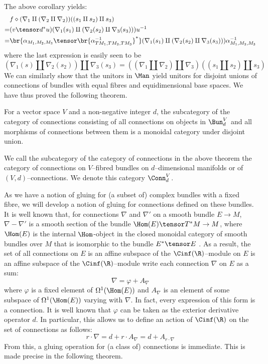 \documentclass[\PRJWD/Thick_TQFTs_and_Quantum_Information.tex]{subfiles}
\begin{document}
The above corollary yields:
\begin{align*}
   & f \diamond (\nabla_1 \amalg (\nabla_2 \amalg \nabla_2))(
        (s_1 \amalg s_2) \amalg s_3
     ) \\
  =& (v \tensor d^*u)(
      \nabla_1(s_1) \amalg (\nabla_2(s_2) \amalg \nabla_3(s_3))
     )u^{-1} \\
  =& \br{\alpha_{M_1, M_2, M_3} \tensor \br{\alpha^{-1}_{TM_1, TM_2, TM_3}}^*}(
      \nabla_1(s_1) \amalg (\nabla_2(s_2) \amalg \nabla_3(s_3))
     )\alpha_{M_1, M_2, M_3}^{-1}
\end{align*}
where the last expression is easily seen to be
\[
  (\nabla_1(s) \amalg \nabla_2(s_2)) \amalg \nabla_3(s_3)
  = ((\nabla_1 \amalg \nabla_2) \amalg \nabla_3)((s_1 \amalg s_2) \amalg s_3)
\]
We can similarly show that the unitors in $\Man$ yield unitors for disjoint
unions of connections of bundles with equal fibres and equidimensional base
spaces. We have thus proved the following theorem.
\begin{thm}\label{thm:bundle_gluing}
For a vector space $V$ and a non-negative integer $d$, the subcategory of the
category of connections consisting of all connections on objects in
$\Bun_d^{V}$ and all morphisms of connections between them is a monoidal
category under disjoint union.
\end{thm}
\begin{defn}
We call the subcategory of the category of connections in the above theorem the
category of connections on $V$--fibred bundles on $d$--dimensional manifolds or
of $(V, d)$--connections. We denote this category $\Conn^V_d$.
\end{defn}

As we have a notion of gluing for (a subset of) complex bundles with a fixed
fibre, we will develop a notion of gluing for connections defined on these
bundles. It is well known that, for connections $\nabla$ and $\nabla'$ on a
smooth bundle $E \to M$, $\nabla - \nabla'$ is a smooth section of the bundle
$\Hom(E) \tensor T^*M \to M$, where $\Hom(E)$ is the internal $\Hom$-object in
the closed monoidal category of smooth bundles over $M$ that is isomorphic to
the bundle $E^* \tensor E$ \cite[Lemma 2.2]{Conn}. As a result, the set of all
connections on $E$ is an affine subspace of the $\Cinf(\R)$--module on $E$ is an
affine subspace of the $\Cinf(\R)$--module write each connection $\nabla$ on $E$
as a sum:
\[
  \nabla = \varphi + A_{\nabla}
\]
where $\varphi$ is a fixed element of $\Omega^1(\Hom(E))$ and $A_{\nabla}$
is an element of some subspace of $\Omega^1(\Hom(E))$ varying with $\nabla$. In
fact, every expression of this form is a connection. It is well known that
$\varphi$ can be taken as the exterior derivative operator $d$. In particular,
this allows us to define an action of $\Cinf(\R)$ on the set of connections as
follows:
\[
  r \cdot \nabla = d + r \cdot A_{\nabla} = d + A_{r \cdot \nabla}
\]
From this, a gluing operation for (a class of) connections is immediate. This
is made precise in the following theorem.
\end{document}
